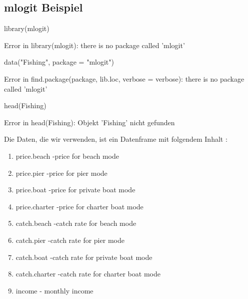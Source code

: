 \documentclass[a4paper,twoside]{tufte-book}\usepackage[]{graphicx}\usepackage[]{color}
\begin{document}
\begin{appendices}
\subsection{mlogit Beispiel}


\begin{Schunk}
\begin{Sinput}
library(mlogit)
\end{Sinput}
\begin{Soutput}
Error in library(mlogit): there is no package called 'mlogit'
\end{Soutput}
\begin{Sinput}
data("Fishing", package = "mlogit")
\end{Sinput}
\begin{Soutput}
Error in find.package(package, lib.loc, verbose = verbose): there is no package called 'mlogit'
\end{Soutput}
\begin{Sinput}
head(Fishing)
\end{Sinput}
\begin{Soutput}
Error in head(Fishing): Objekt 'Fishing' nicht gefunden
\end{Soutput}
\end{Schunk}

Die Daten, die wir verwenden, ist ein Datenframe mit folgendem Inhalt :

\begin{enumerate}
\setlength\itemsep{-0.5em}
\item price.beach -price for beach mode

\item price.pier -price for pier mode

\item price.boat -price for private boat mode

\item price.charter -price for charter boat mode

\item catch.beach -catch rate for beach mode

\item catch.pier -catch rate for pier mode

\item catch.boat -catch rate for private boat mode

\item catch.charter -catch rate for charter boat mode

\item income - monthly income


\end{enumerate}
\end{appendices}
\end{document}
